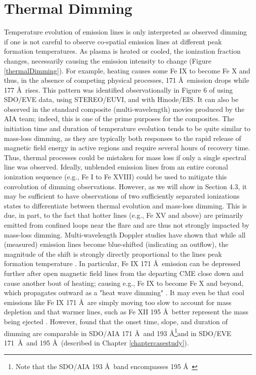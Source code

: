 \section{Thermal Dimming}
Temperature evolution of emission lines is only interpreted as observed dimming if one is not careful to observe co-spatial emission lines at different peak formation temperatures. As plasma is heated or cooled, the ionization fraction changes, necessarily causing the emission intensity to change (Figure \ref{thermalDimming}). For example, heating causes some Fe IX to become Fe X and thus, in the absence of competing physical processes, 171 \AA\ emission drops while 177 \AA\ rises. This pattern was identified observationally in Figure 6 of \citet{Woods2011} using SDO/EVE data, \citet{Robbrecht2010} using STEREO/EUVI, \citet{Jin2009} and \citet{Imada2007} with Hinode/EIS. It can also be observed in the standard composite (multi-wavelength) movies produced by the AIA team; indeed, this is one of the prime purposes for the composites. The initiation time and duration of temperature evolution tends to be quite similar to mass-loss dimming, as they are typically both responses to the rapid release of magnetic field energy in active regions and require several hours of recovery time. Thus, thermal processes could be mistaken for mass loss if only a single spectral line was observed. Ideally, unblended emission lines from an entire coronal ionization sequence (e.g., Fe I to Fe XVIII) could be used to mitigate this convolution of dimming observations. However, as we will show in Section 4.3, it may be sufficient to have observations of two sufficiently separated ionizations states to differentiate between thermal evolution and mass-loss dimming. This is due, in part, to the fact that hotter lines (e.g., Fe XV and above) are primarily emitted from confined loops near the flare and are thus not strongly impacted by mass-loss dimming. Multi-wavelength Doppler studies have shown that while all (measured) emission lines become blue-shifted (indicating an outflow), the magnitude of the shift is strongly directly proportional to the lines peak formation temperature \citep{Imada2007, Jin2009}. In particular, Fe IX 171 \AA\ emission can be depressed further after open magnetic field lines from the departing CME close down and cause another bout of heating; causing e.g., Fe IX to become Fe X and beyond, which propagates outward as a "heat wave dimming" \citep{Robbrecht2010}. It may even be that cool emissions like Fe IX 171 \AA\ are simply moving too slow to account for mass depletion and that warmer lines, such as Fe XII 195 \AA\ better represent the mass being ejected \citep{Robbrecht2010}. However, \citet{Mason2014} found that the onset time, slope, and duration of dimming are comparable in SDO/AIA 171 \AA\ and 193 \AA\footnote{Note that the SDO/AIA 193 \AA\ band encompasses 195 \AA\ }and in SDO/EVE 171 \AA\ and 195 \AA\ (described in Chapter \ref{chaptercasestudy}). 

